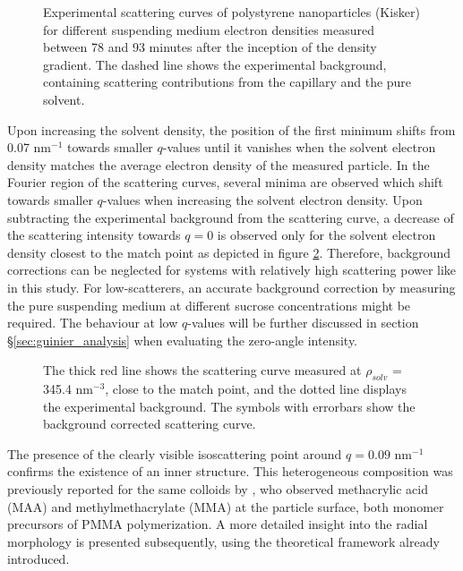 \begin{figure}%
	\centering
		
		\caption{Experimental scattering curves of polystyrene nanoparticles (Kisker) for different suspending medium electron densities measured between 78 and 93 minutes after the inception of the density gradient. The dashed line shows the experimental background, containing scattering contributions from the capillary and the pure solvent.}
		\label{fig:KiskerContinuousSAXS}
\end{figure}

Upon increasing the solvent density, the position of the first minimum shifts from 0.07 nm\(^{-1}\) towards smaller \(q\)-values until it vanishes when the solvent electron density matches the average electron density of the measured particle. In the Fourier region of the scattering curves, several minima are observed which shift towards smaller \(q\)-values when increasing the solvent electron density. Upon subtracting the experimental background from the scattering curve, a decrease of the scattering intensity towards $q=0$ is observed only for the solvent electron density closest to the match point as depicted in figure \ref{fig:KiskerBackgroundSubtraction}. Therefore, background corrections can be neglected for systems with relatively high scattering power like in this study. For low-scatterers, an accurate background correction by measuring the pure suspending medium at different sucrose concentrations might be required. The behaviour at low $q$-values will be further discussed in section \S\ref{sec:guinier_analysis} when evaluating the zero-angle intensity.

\begin{figure}%
	\centering
		
		\caption{The thick red line shows the scattering curve measured at $\rho_{solv}$ = 345.4 nm$^{-3}$, close to the match point, and the dotted line displays the experimental background. The symbols with errorbars show the background corrected scattering curve.}
		\label{fig:KiskerBackgroundSubtraction}
\end{figure}

The presence of the clearly visible isoscattering point around \(q=0.09\) nm\(^{-1}\) confirms the existence of an inner structure. This heterogeneous composition was previously reported for the same colloids by \citet{minelli_characterization_2014-1}, who observed methacrylic acid (MAA) and methylmethacrylate (MMA) at the particle surface, both monomer precursors of PMMA polymerization. A more detailed insight into the radial morphology is presented subsequently, using the theoretical framework already introduced.

